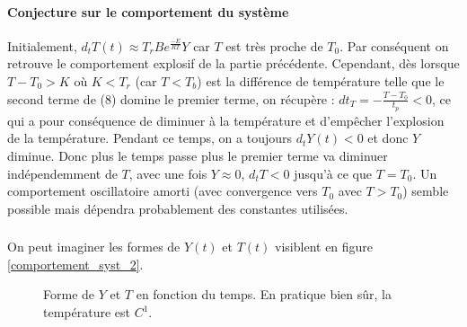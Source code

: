 \documentclass[10pt,a4paper,twocolumn]{report}
\begin{document}
\paragraph{Conjecture sur le comportement du système}

Initialement, $d_tT(t) \approx T_rBe^{\frac{-E}{RT}}Y$ car $T$ est très proche de $T_0$.
Par conséquent on retrouve le comportement explosif de la partie précédente. Cependant, dès lorsque $T-T_0>K$ où $K < T_r$ (car $T<T_b$) est la différence de température telle que le second terme de (8) domine le premier terme, on récupère : $dt_T = -\frac{T-T_0}{t_p} < 0$, ce qui a pour conséquence de diminuer à la température et d'empêcher l'explosion de la température. Pendant ce temps, on a toujours $d_tY(t) < 0$ et donc $Y$ diminue. Donc plus le temps passe plus le premier terme va diminuer indépendemment de $T$, avec une fois $Y\approx0$, $d_tT < 0$ jusqu'à ce que $T=T_0$. Un comportement oscillatoire amorti (avec convergence vers $T_0$ avec $T>T_0$) semble possible mais dépendra probablement des constantes utilisées.

\subsubsection{}

On peut imaginer les formes de $Y(t)$ et $T(t)$ visiblent en figure \ref{comportement_syst_2}.

\begin{figure}
	\centering
	\centering
	
	
	\caption{Forme de $Y$ et $T$ en fonction du temps. En pratique bien sûr, la température est $C^1$.}
	\end{figure} \label{comportement_syst_2}
\end{document}
